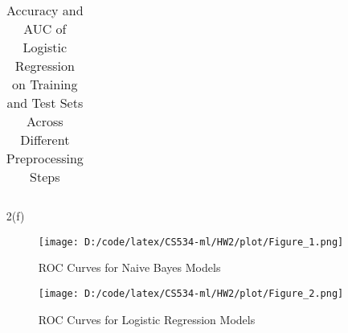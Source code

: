 \documentclass[10pt,letterpaper]{article}
\begin{document}
\begin{itemize}
\begin{table}[H]
\begin{tabular}{lcccc}
                        \bottomrule
                    \end{tabular}
                    \caption{Accuracy and AUC of Logistic Regression on Training and Test Sets Across Different Preprocessing Steps}
                    \label{tab:lr_results}
                \end{table}
            \item[2(f)] 
                \begin{figure}[H]
                    \centering
                    \texttt{[image: D:/code/latex/CS534-ml/HW2/plot/Figure\_1.png]}
                    \caption{ROC Curves for Naive Bayes Models}
                    \label{fig:nb_roc}
                \end{figure}
                
                \begin{figure}[H]
                    \centering
                    \texttt{[image: D:/code/latex/CS534-ml/HW2/plot/Figure\_2.png]}
                    \caption{ROC Curves for Logistic Regression Models}
                    \label{fig:lr_roc}
                \end{figure}
                

\end{itemize}
\end{document}
